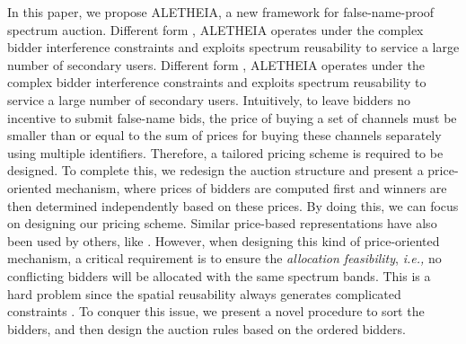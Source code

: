 \documentclass{sig-alternate}
\begin{document}
In this paper, we propose ALETHEIA, a new framework for false-name-proof spectrum auction.  Different form \cite{Yokoo:AI:02,Yokoo:ijcai:01}, ALETHEIA operates under the complex bidder interference constraints and exploits spectrum reusability to service a large number of secondary users. Different form \cite{Yokoo:AI:02,Yokoo:ijcai:01}, ALETHEIA operates under the complex bidder interference constraints and exploits spectrum reusability to service a large number of secondary users. Intuitively, to leave bidders no incentive to submit false-name bids, the price of buying a set of channels must be smaller than or equal to the sum of prices for buying these channels separately using multiple identifiers. Therefore, a tailored pricing scheme is required to be designed. To complete this, we redesign the auction structure and present a price-oriented mechanism, where prices of bidders are computed first and winners are then determined independently based on these prices.
By doing this, we can focus on designing our pricing scheme. Similar price-based representations have also been used by others, like \cite{Lavi:03:FOCS}. However, when designing this kind of price-oriented mechanism, a critical requirement is to ensure the \emph{allocation feasibility}, \emph{i.e.,} no conflicting bidders will be allocated with the same spectrum bands. This is a hard problem since the spatial reusability always generates complicated constraints \cite{Mobicom08:Zhou}. To conquer this issue, we present a novel procedure to sort the bidders, and then design the auction rules based on the ordered bidders.

\end{document}
